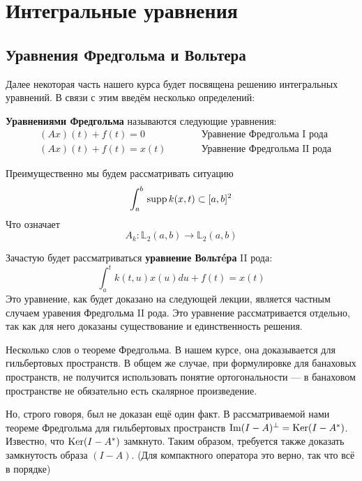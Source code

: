 \documentclass[12pt]{article}
\begin{document}
\section{Интегральные уравнения}

	\subsection{Уравнения Фредгольма и Вольтера}

		Далее некоторая часть нашего курса будет посвящена решению интегральных уравнений. В связи с этим введём несколько определений:
	
		\begin{defi}
			\textbf{Уравнениями Фредгольма} называются следующие уравнения:
			\begin{align*}
				&(Ax)(t) + f(t) = 0 &\qquad &\text{Уравнение Фредгольма I рода} \\
				&(Ax)(t) + f(t) = x(t) &\qquad &\text{Уравнение Фредгольма II рода}
			\end{align*}
		\end{defi}
	
		Преимущественно мы будем рассматривать ситуацию 
		$$\int_a^b \,\text{supp}\, k(x,t) \subset [a,b]^2$$
		Что означает
		$$A_k: \mathbb{L}_2(a,b) \rightarrow \mathbb{L}_2(a,b)$$
	
		Зачастую будет рассматриваться \textbf{уравнение Вольт\'eра} II рода:
		$$\int_a^t k(t,u) x(u) du + f(t) = x(t)$$
		Это уравнение, как будет доказано на следующей лекции, является частным случаем уравения Фредгольма 
		II рода. Это уравнение рассматривается отдельно, так как для него доказаны существование и единственность
		решения.


		{\footnotesize
			Несколько слов о теореме Фредгольма. В нашем курсе, она доказывается для гильбертовых пространств.
			В общем же случае, при формулировке для банаховых пространств, не получится использовать понятие
			ортогональности --- в банаховом пространстве не обязательно есть скалярное произведение. \par
		
			Но, строго говоря, был не доказан ещё один факт. В рассматриваемой нами теореме Фредгольма 
			для гильбертовых пространств $\text{Im}(I - A)^{\perp} = \text{Ker}(I - A^*)$. Известно, что $\text{Ker}(I-A^*)$ 
			замкнуто. Таким образом, требуется также доказать замкнутость образа $(I-A)$. (Для компактного
			оператора это верно, так что всё в порядке)
		}
\end{document}
